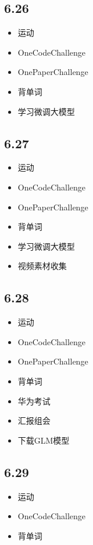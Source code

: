 \documentclass[UTF8]{ctexart}
\begin{document}
\subsection*{6.26}
\begin{itemize}
    \item 运动
    \item OneCodeChallenge
    \item OnePaperChallenge
    \item 背单词
    \item 学习微调大模型
\end{itemize}

\subsection*{6.27}
\begin{itemize}
    \item 运动
    \item OneCodeChallenge
    \item OnePaperChallenge
    \item 背单词
    \item 学习微调大模型
    \item 视频素材收集
\end{itemize}

\subsection*{6.28}
\begin{itemize}
    \item 运动
    \item OneCodeChallenge
    \item OnePaperChallenge
    \item 背单词
    \item 华为考试
    \item 汇报组会
    \item 下载GLM模型
\end{itemize}

\subsection*{6.29}
\begin{itemize}
    \item 运动
    \item OneCodeChallenge
    \item 背单词
\end{itemize}
\end{document}
